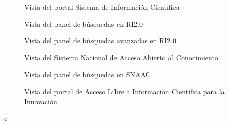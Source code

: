 \begin{figure}[!ht]
	\centering
    \caption{Vista del portal Sistema de Información Científica} %
    \label{ri2.0-1}
\end{figure}

\begin{figure}[!ht]
	\centering
    \caption{Vista del panel de búsquedas en RI2.0} %
    \label{ri2.0-2}
\end{figure}

\begin{figure}[!ht]
	\centering
    \caption{Vista del panel de búsquedas avanzadas en RI2.0} %
    \label{ri2.0-3}
\end{figure}

\begin{figure}[!ht]
	\centering
    \caption{Vista del Sistema Nacional de Acceso Abierto al Conocimiento} %
    \label{snaac-1}
\end{figure}

\begin{figure}[!ht]
	\centering
    \caption{Vista del panel de búsquedas en SNAAC} %
    \label{snaac-2} 
\end{figure}

\begin{figure}[!ht]
	\centering
    \caption{Vista del portal de Acceso Libre a Información Científica para la Innovación} %
    \label{alicia-1}
\end{figure}

c